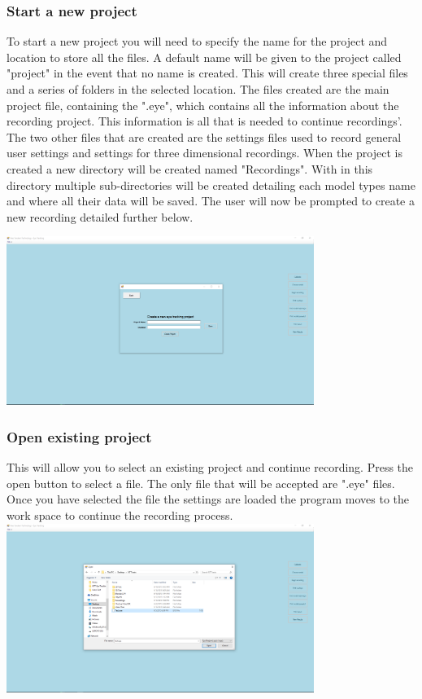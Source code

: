 \subsubsection{Start a new project} 
To start a new project you will need to specify the name for the project and location to store all the files. A default name will be given to the project called "project" in the event that no name is created. This will create three special files and a series of folders in the selected location. The files created are the main project file, containing the ".eye", which contains all the information about the recording project. This information is all that is needed to continue recordings'. The two other files that are created are the settings files used to record general user settings and settings for three dimensional recordings. When the project is created a new directory will be created named "Recordings". With in this directory multiple sub-directories will be created detailing each model types name and where all their data will be saved. The user will now be prompted to create a new recording detailed further below.

		\includegraphics[scale=0.2, width=10cm, keepaspectratio]{./Images/NewProject.PNG}

\subsubsection{Open existing project} 
This will allow you to select an existing project and continue recording. Press the open button to select a file. The only file that will be accepted are ".eye" files. Once you have selected the file the settings are loaded the program moves to the work space to continue the recording process.\\
		\includegraphics[scale=0.2, width=10cm, keepaspectratio]{./Images/OpenProject.PNG}\\
		

